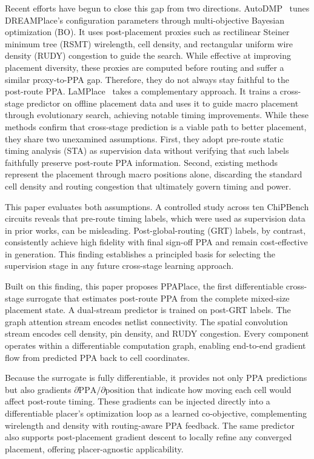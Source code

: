 \documentclass[sigconf,anonymous,review,9pt]{acmart}
\begin{document}
Recent efforts have begun to close this gap from two
directions. AutoDMP~\cite{autodmp2023} tunes DREAMPlace's configuration
parameters through multi-objective Bayesian optimization (BO). It
uses post-placement proxies such as rectilinear Steiner minimum tree
(RSMT) wirelength, cell density, and rectangular uniform wire density
(RUDY) congestion to guide the search. While effective at improving placement
diversity, these proxies are computed before routing and suffer a similar
proxy-to-PPA gap. Therefore, they do not always stay faithful to the post-route PPA.
LaMPlace~\cite{lamplace2025} takes a complementary approach. It trains a
cross-stage predictor on offline placement data and uses it to guide
macro placement through evolutionary search, achieving notable timing
improvements. While these methods confirm that cross-stage prediction
is a viable path to better placement, they share two
unexamined assumptions. First, they adopt pre-route static timing analysis (STA)
as supervision data without verifying that such labels faithfully
preserve post-route PPA information. Second, existing methods represent the placement through macro positions alone, discarding the standard cell density
and routing congestion that ultimately govern timing and power.

This paper evaluates both assumptions. A controlled study across ten ChiPBench circuits reveals that pre-route timing labels, which were used as supervision data in prior works, can be misleading. Post-global-routing (GRT) labels, by contrast, consistently achieve high fidelity with final sign-off PPA and remain cost-effective in generation. This finding establishes a principled basis for selecting the supervision stage in any future cross-stage learning approach.

Built on this finding, this paper proposes PPAPlace, the first
differentiable cross-stage surrogate that estimates post-route PPA
from the complete mixed-size placement state. A dual-stream predictor
is trained on post-GRT labels. The graph attention stream encodes
netlist connectivity. The spatial convolution stream encodes cell
density, pin density, and RUDY congestion. Every component operates
within a differentiable computation graph, enabling end-to-end
gradient flow from predicted PPA back to cell coordinates.

Because the surrogate is fully differentiable, it provides not only
PPA predictions but also gradients
$\partial\text{PPA}/\partial\text{position}$ that indicate how moving
each cell would affect post-route timing. These gradients can be
injected directly into a differentiable placer's optimization loop as a
learned co-objective, complementing wirelength and density with
routing-aware PPA feedback. The same predictor also supports post-placement gradient descent to locally refine any converged placement, offering placer-agnostic
applicability.
\end{document}
